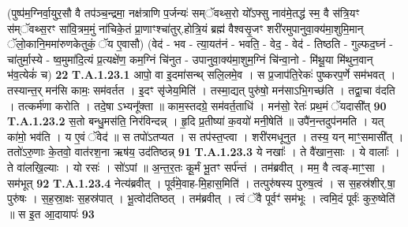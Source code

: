 \documentclass[17pt]{extarticle}
\begin{document}
                (पुष्प॑म॒ग्निर्वा॒युर॒सौ वै तप॑ञ्च॒न्द्रमा॒ नक्ष॑त्राणि प॒र्जन्यः॑ सम्ॅवथ्स॒रो यो᳚ऽफ्सु नाव॑मे॒तद्ध॑ स्म॒ वै स॑त्रि॒यꣳ स॑म्ॅवथ्स॒रꣳ सा॑वि॒त्रम॒मुं ना॑चिके॒तं प्रा॒णाꣳश्चा॑तुर्.होत्रि॒यं ब्रह्म॑ वैश्वसृ॒जꣳ शरी॑रमुपानुवा॒क्य॑मा॒शुमि॒मान् ॅलो॒कानि॒ममा॑रुणकेतुकं॒ ॅय ए॒वासौ) \newline
                                      (वेद॑ - भव - त्या॒यत॑नं - भवति॒ - वेद॒ - वेद॑ - तिष्ठति - गुल्फद॒घ्नं - चा॑तुर्मा॒स्ये - ष्व॒मुमा॑दि॒त्यं प्र॒त्यक्षे॑ण॒ कम॒ग्निं चि॑नुत - उपानुवा॒क्य॑मा॒शुम॒ग्निं चि॑न्वा॒नो - मि॑थू॒या मि॑थुन॒वान् भ॑व॒त्येकं॑ च) \textbf{22} \newline \newline
                                \textbf{ T.A.1.23.1} \newline
                  आपो॒ वा इ॒दमा॑सन्थ् सलि॒लमे॒व ।  स प्र॒जाप॑ति॒रेकः॑ पुष्करप॒र्णे सम॑भवत् ।  तस्यान्त॒र् मन॑सि कामः॒ सम॑वर्तत । इ॒दꣳ सृ॑जेय॒मिति॑ । तस्मा॒द्यत् पुरु॑षो॒ मन॑साऽभि॒गच्छ॑ति । तद्वा॒चा व॑दति ।  तत्कर्म॑णा करोति । तदे॒षा ऽभ्यनू᳚क्ता ॥ काम॒स्तदग्रे॒ सम॑वर्त॒ताधि॑ । मन॑सो॒ रेतः॑ प्रथ॒मं ॅयदासी᳚त् \textbf{ 90} \newline
                  \newline
                                                                  \textbf{ T.A.1.23.2} \newline
                  स॒तो बन्धु॒मस॑ति॒ निर॑विन्दन्न् । हृ॒दि प्र॒तीष्या॑ क॒वयो॑ मनी॒षेति॑ ॥ उपै॑न॒न्तदुप॑नमति । यत् का॑मो॒ भव॑ति । य ए॒वं ॅवेद॑ ॥ स तपो॑ऽतप्यत ।  स तप॑स्त॒प्त्वा । शरी॑रमधूनुत । तस्य॒ यन् माꣳ॒॒समासी᳚त् । ततो॑ऽरु॒णाः के॒तवो॒ वात॑रश॒ना ऋष॑य॒ उद॑तिष्ठन्न् \textbf{ 91} \newline
                  \newline
                                                                  \textbf{ T.A.1.23.3} \newline
                  ये नखाः᳚ । ते वै॑खान॒साः । ये वालाः᳚ । ते वा॑लखि॒ल्याः । यो रसः॑ । सो॑ऽपां ॥ अ॒न्त॒र॒तः कू॒र्मं भू॒तꣳ सर्प॑न्तं । तम॑ब्रवीत् । मम॒ वै त्वङ्-माꣳ॒॒सा । सम॑भूत् \textbf{ 92} \newline
                  \newline
                                                                  \textbf{ T.A.1.23.4} \newline
                  नेत्य॑ब्रवीत् । पूर्व॑मे॒वाह-मि॒हास॒मिति॑ । तत्पुरु॑षस्य पुरुष॒त्वं । स स॒हस्र॑शीर्.षा॒ पुरु॑षः । स॒ह॒स्रा॒क्षः स॒हस्र॑पात् । भू॒त्वोद॑तिष्ठत् । तम॑ब्रवीत् । त्वं ॅवै पूर्वꣳ॑ सम॑भूः ।  त्वमि॒दं पूर्वः॑ कुरु॒ष्वेति॑ ॥ स इ॒त आ॒दायापः॑ \textbf{ 93} \newline
\end{document}
